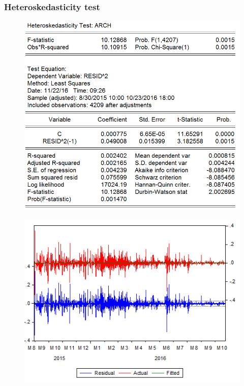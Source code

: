 \documentclass[11pt]{report}
\begin{document}
\subsubsection*{Heteroskedasticity test}
\begin{figure}[!h]
\centering
\includegraphics[scale=0.5]{Appendix/chap3/1}
\end{figure}
\begin{figure}[!h]
\centering
\includegraphics[scale=1]{Appendix/chap3/2}
\end{figure}
\clearpage
\end{document}
